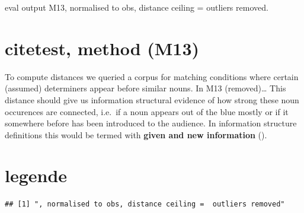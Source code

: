 \documentclass[12pt,a4paper]{article}
\begin{document}
eval output M13, normalised to obs, distance ceiling = outliers removed.

\section{citetest, method (M13)}\label{citetest-method-m13}

To compute distances we queried a corpus for matching conditions where certain (assumed) determiners appear before similar nouns. In M13 (removed)\ldots{} This distance should give us information structural evidence of how strong these noun occurences are connected, i.e.~if a noun appears out of the blue mostly or if it somewhere before has been introduced to the audience. In information structure definitions this would be termed with \textbf{given and new information} ().

\section{legende}\label{legende}

\begin{verbatim}
## [1] ", normalised to obs, distance ceiling =  outliers removed"
\end{verbatim}
\end{document}
